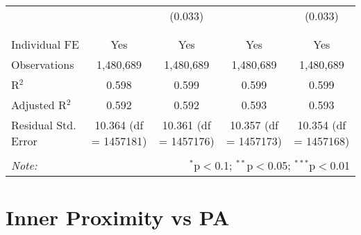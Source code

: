 \documentclass[
]{article}
\begin{document}
\begin{table}[!htbp]
{\begin{tabular}{@{\extracolsep{5pt}}lcccc}
  &  & (0.033) &  & (0.033) \\ 
  & & & & \\ 
\hline \\[-1.8ex] 
Individual FE & Yes & Yes & Yes & Yes \\ 
Observations & 1,480,689 & 1,480,689 & 1,480,689 & 1,480,689 \\ 
R$^{2}$ & 0.598 & 0.599 & 0.599 & 0.599 \\ 
Adjusted R$^{2}$ & 0.592 & 0.592 & 0.593 & 0.593 \\ 
Residual Std. Error & 10.364 (df = 1457181) & 10.361 (df = 1457176) & 10.357 (df = 1457173) & 10.354 (df = 1457168) \\ 
\hline 
\hline \\[-1.8ex] 
\textit{Note:}  & \multicolumn{4}{r}{$^{*}$p$<$0.1; $^{**}$p$<$0.05; $^{***}$p$<$0.01} \\ 
\end{tabular}
} 
\end{table} 
\newpage
\section{Inner Proximity vs PA}
\end{document}
